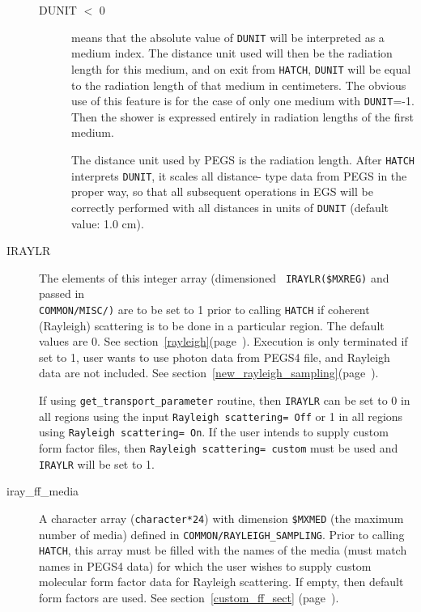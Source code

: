 \begin{description}
\begin{description}
 \item[DUNIT $<$ 0] means that the absolute value of {\tt DUNIT} will be
interpreted as a medium index.  The distance unit used will then be the
radiation length for this medium, and on exit from {\tt HATCH}, {\tt DUNIT} will be
equal to the radiation length of that medium in centimeters.  The obvious
use of this feature is for the case of only one medium with {\tt DUNIT}=-1.  Then
the shower is expressed entirely in radiation lengths of the first medium.


The distance unit used by PEGS is the radiation length.  After {\tt HATCH}
interprets {\tt DUNIT}, it scales all distance- type data from PEGS in the proper
way, so that all subsequent operations in EGS will be correctly performed
with all distances in units of {\tt DUNIT} (default value: 1.0 cm).
\end{description}


\item[IRAYLR] The elements of this integer array (dimensioned {\tt
IRAYLR(\$MXREG)} and passed in\\ {\tt COMMON/MISC/)} are to be set to 1
prior to calling {\tt HATCH} if coherent (Rayleigh) scattering is to be done
in a particular region. The default values are 0.
See section~\ref{rayleigh}(page~\pageref{rayleigh}).
Execution is only terminated if set to 1, user wants to use photon data
from PEGS4 file, and Rayleigh data are not included.
See section~\ref{new_rayleigh_sampling}(page~\pageref{new_rayleigh_sampling}).

If using {\tt get\_transport\_parameter} routine, then {\tt IRAYLR} can
be set to 0 in all regions using the input {\tt Rayleigh scattering= Off}
or 1 in all regions using {\tt Rayleigh scattering= On}. If the user
intends to supply custom form factor files, then
{\tt Rayleigh scattering= custom} must be used and {\tt IRAYLR} will
be set to 1.

\item[iray\_ff\_media] A character array ({\tt character*24}) with
dimension {\tt \$MXMED} (the maximum number of media) defined in
{\tt COMMON/RAYLEIGH\_SAMPLING}.  Prior
to calling {\tt HATCH}, this array must be filled with the
names of the media (must match names in PEGS4 data) for which the user
wishes to supply custom molecular form factor data for Rayleigh
scattering.  If empty, then default form factors are used.
See section~\ref{custom_ff_sect} (page~\pageref{custom_ff_sect}).


\end{description}

